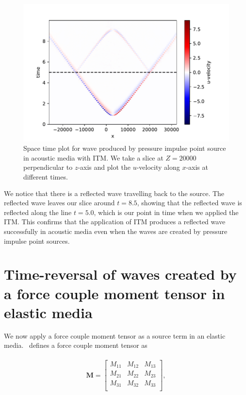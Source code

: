 \begin{figure}[!htpb]
    \centering
    \includegraphics[width=0.75\linewidth]{figures/pressure-impulse-ITM.pdf}
    \caption{Space time plot for wave produced by pressure impulse point source in acoustic media with \ac{ITM}. We take a slice at $Z=20000$ perpendicular to $z$-axis and plot the
    $u$-velocity along $x$-axis at different times.}
    \label{fig:space-timeplot-pressureITM}
\end{figure}

We notice that there is a reflected wave travelling back to the source. The reflected wave leaves our slice around $t=8.5$, showing that the reflected wave is reflected
along the line $t=5.0$, which is our point in time when we applied the \ac{ITM}. This confirms that the application of \ac{ITM} produces a reflected wave successfully in acoustic media even
when the waves are created by pressure impulse point sources.

\section{Time-reversal of waves created by a force couple moment tensor in elastic media}\label{sec:doublecouple}
We now apply a force couple moment tensor as a source term in an elastic media.~\parencite[Sec. 9.2]{shearer_2019} defines a force couple moment tensor as

\begin{align}
    \begin{split}
        \mathbf{M} =
            \begin{bmatrix}
                M_{11} & M_{12} & M_{13} \\
                M_{21} & M_{22} & M_{23} \\
                M_{31} & M_{32} & M_{33} \\
            \end{bmatrix} ,
    \end{split}
\end{align}

